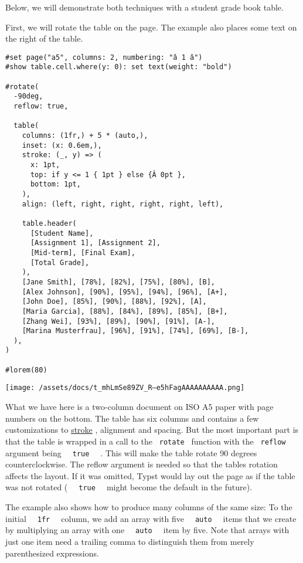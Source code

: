 Below, we will demonstrate both techniques with a student grade book
table.

First, we will rotate the table on the page. The example also places
some text on the right of the table.

\begin{verbatim}
#set page("a5", columns: 2, numbering: "â 1 â")
#show table.cell.where(y: 0): set text(weight: "bold")

#rotate(
  -90deg,
  reflow: true,

  table(
    columns: (1fr,) + 5 * (auto,),
    inset: (x: 0.6em,),
    stroke: (_, y) => (
      x: 1pt,
      top: if y <= 1 { 1pt } else {Â 0pt },
      bottom: 1pt,
    ),
    align: (left, right, right, right, right, left),

    table.header(
      [Student Name],
      [Assignment 1], [Assignment 2],
      [Mid-term], [Final Exam],
      [Total Grade],
    ),
    [Jane Smith], [78%], [82%], [75%], [80%], [B],
    [Alex Johnson], [90%], [95%], [94%], [96%], [A+],
    [John Doe], [85%], [90%], [88%], [92%], [A],
    [Maria Garcia], [88%], [84%], [89%], [85%], [B+],
    [Zhang Wei], [93%], [89%], [90%], [91%], [A-],
    [Marina Musterfrau], [96%], [91%], [74%], [69%], [B-],
  ),
)

#lorem(80)
\end{verbatim}

\texttt{[image: /assets/docs/t\_mhLmSe89ZV\_R--e5hFagAAAAAAAAAA.png]}

What we have here is a two-column document on ISO A5 paper with page
numbers on the bottom. The table has six columns and contains a few
customizations to \hyperref[strokes]{stroke} , alignment and spacing.
But the most important part is that the table is wrapped in a call to
the \texttt{\ rotate\ } function with the \texttt{\ reflow\ } argument
being \texttt{\ }{\texttt{\ true\ }}\texttt{\ } . This will make the
table rotate 90 degrees counterclockwise. The reflow argument is needed
so that the table\textquotesingle s rotation affects the layout. If it
was omitted, Typst would lay out the page as if the table was not
rotated ( \texttt{\ }{\texttt{\ true\ }}\texttt{\ } might become the
default in the future).

The example also shows how to produce many columns of the same size: To
the initial \texttt{\ }{\texttt{\ 1fr\ }}\texttt{\ } column, we add an
array with five \texttt{\ }{\texttt{\ auto\ }}\texttt{\ } items that we
create by multiplying an array with one
\texttt{\ }{\texttt{\ auto\ }}\texttt{\ } item by five. Note that arrays
with just one item need a trailing comma to distinguish them from merely
parenthesized expressions.

